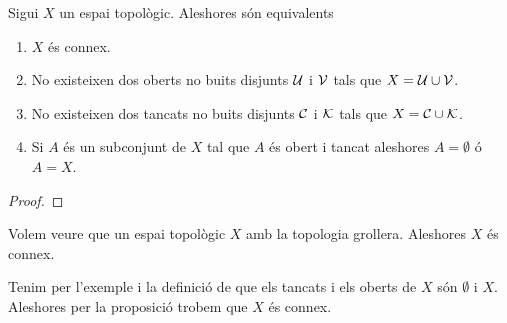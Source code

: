 \documentclass[../Apunts.tex]{subfiles}
\begin{document}
	\begin{proposition}
		\label{prop:condicions equivalents a espai connex}
		Sigui \(X\) un espai topològic. Aleshores són equivalents
		\begin{enumerate}
			\item\label{prop:condicions equivalents a espai connex:eq1} \(X\) és connex.
			\item\label{prop:condicions equivalents a espai connex:eq2} No existeixen dos oberts no buits disjunts \(\mathcal{U}\) i \(\mathcal{V}\) tals que \(X=\mathcal{U}\cup\mathcal{V}\).
			\item\label{prop:condicions equivalents a espai connex:eq3} No existeixen dos tancats no buits disjunts \(\mathcal{C}\) i \(\mathcal{K}\) tals que \(X=\mathcal{C}\cup\mathcal{K}\).
			\item\label{prop:condicions equivalents a espai connex:eq4} Si \(A\) és un subconjunt de \(X\) tal que \(A\) és obert i tancat aleshores \(A=\emptyset\) ó \(A=X\).
		\end{enumerate}
		\begin{proof}
		\end{proof}
	\end{proposition}
	\begin{example}
		\label{ex:l'espai amb la topologia grollera és connex}
		Volem veure que un espai topològic \(X\) amb la topologia grollera. Aleshores \(X\) és connex.
		\begin{solution}
			Tenim per l'exemple  i la definició de  que els tancats i els oberts de \(X\) són \(\emptyset\) i \(X\). Aleshores per la proposició  trobem que \(X\) és connex.
		\end{solution}
	\end{example}
\end{document}
